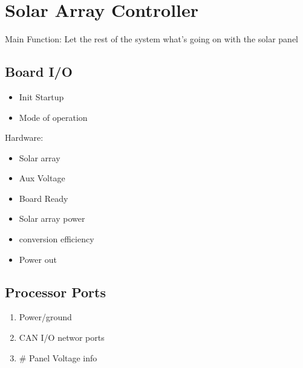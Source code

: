 \documentclass[letterpaper,12pt]{article}
\begin{document}
\pagebreak

\pagebreak
\section{Solar Array Controller}
   Main Function: Let the rest of the system what's going on with the solar panel
   \subsection{Board I/O}
   \begin{multicols}{2}
   
   \begin{itemize}
      \item Init Startup
      \item Mode of operation
   \end{itemize}
   
   Hardware:
   \begin{itemize}
      \item Solar array
      \item Aux Voltage
   \end{itemize}
   
   \columnbreak
   

   \begin{itemize}
      \item Board Ready
      \item Solar array power
      \item conversion efficiency
   \end{itemize}

   \begin{itemize}
      \item Power out
   \end{itemize}
   \end{multicols}

   \subsection{Processor Ports}
   \begin{multicols}{2}
      \begin{enumerate}[(a.)]
      \item Power/ground
      \item CAN I/O networ ports
      \item \# Panel Voltage info
   \end{enumerate}
   \end{multicols}
\end{document}
